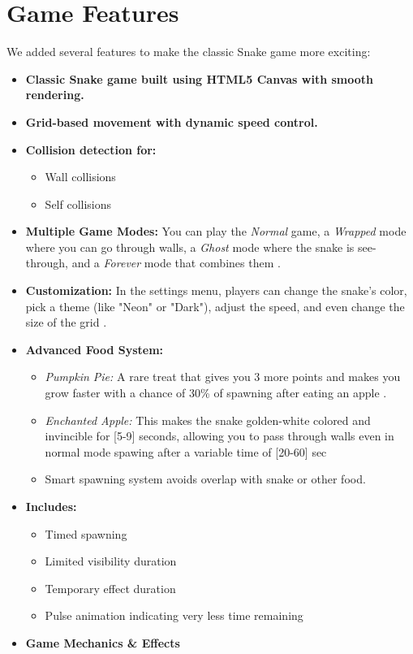 \section{Game Features}
We added several features to make the classic Snake game more exciting:
\begin{itemize}
    \item \textbf{ Classic Snake game built using HTML5 Canvas with smooth rendering.}
\item  \textbf{Grid-based movement with dynamic speed control.}
\item \textbf{Collision detection for:}
\begin{itemize}
    \item Wall collisions
    \item Self collisions 
\end{itemize}
    \item \textbf{Multiple Game Modes:} You can play the \textit{Normal} game, a \textit{Wrapped} mode where you can go through walls, a \textit{Ghost} mode where the snake is see-through, and a \textit{Forever} mode that combines them .
    \item \textbf{Customization:} In the settings menu, players can change the snake's color, pick a theme (like "Neon" or "Dark"), adjust the speed, and even change the size of the grid .
    \item \textbf{Advanced Food System:} 
    \begin{itemize}
        \item \textit{Pumpkin Pie:} A rare treat that gives you 3 more points and makes you grow faster with a chance of 30\% of spawning after eating an apple .
        \item \textit{Enchanted Apple:} This makes the snake golden-white colored and invincible for [5-9] seconds, allowing you to pass through walls even in normal mode spawing after a variable time of [20-60] sec 
        \item Smart spawning system avoids overlap with snake or other food.
    \end{itemize}
    \item \textbf{Includes:}
	\begin{itemize}
    \item Timed spawning
	\item Limited visibility duration
	\item Temporary effect duration
    \item Pulse animation indicating very less time remaining
    \end{itemize}
\item \textbf{Game Mechanics & Effects}
\begin{itemize}


\end{itemize}
\end{itemize}
